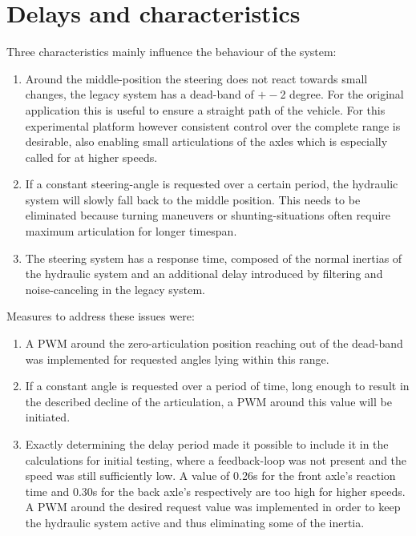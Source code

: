 \documentclass[root.tex]{subfiles}
\begin{document}
	
	{\pagestyle{empty}}
	\section{Delays and characteristics}
	\label{chap:Delays}
	
	Three characteristics mainly influence the behaviour of the system: 
	
	\begin{enumerate}
		\item Around the middle-position the steering does not react towards small changes, the legacy system has a dead-band of $+-$2 degree. For the original application this is useful to ensure a straight path of the vehicle. For this experimental platform however consistent control over the complete range is desirable, also enabling small articulations of the axles which is especially called for at higher speeds. 
		\item If a constant steering-angle is requested over a certain period, the hydraulic system will slowly fall back to the middle position. This needs to be eliminated because turning maneuvers or shunting-situations often require maximum articulation for longer timespan.
		\item The steering system has a response time, composed of the normal inertias of the hydraulic system and an additional delay introduced by filtering and noise-canceling in the legacy system. 
		
	\end{enumerate}
	
	Measures to address these issues were:
	
	\begin{enumerate}
		\item A \gls{PWM} around the zero-articulation position reaching out of the dead-band was implemented for requested angles lying within this range. 
		
		\item If a constant angle is requested over a period of time, long enough to result in the described decline of the articulation, a \gls{PWM} around this value will be initiated. 
		
		\item Exactly determining the delay period made it possible to include it in the calculations for initial testing, where a feedback-loop was not present and the speed was still sufficiently low. A value of 0.26s for the front axle's reaction time and 0.30s for the back axle's respectively are too high for higher speeds.\\
		A \gls{PWM} around the desired request value was implemented in order to keep the hydraulic system active and thus eliminating some of the inertia. 
	\end{enumerate}
	
	
	
	
	
	
\end{document}
